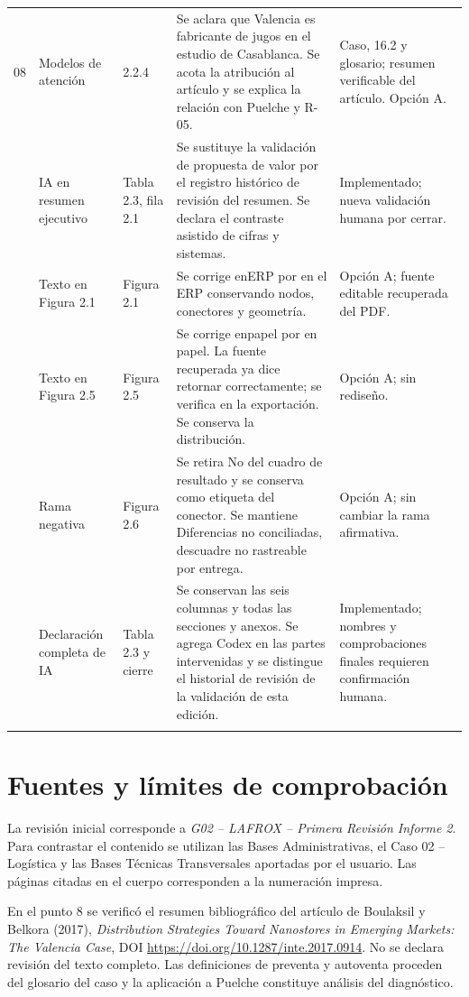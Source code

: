 \documentclass[11pt,letterpaper]{article}
\begin{document}
\begin{longtable}{P{0.55cm}P{2.25cm}P{2.1cm}P{6.1cm}P{4.05cm}}
08 & Modelos de atención & 2.2.4 & Se aclara que Valencia es fabricante de jugos en el estudio de Casablanca. Se acota la atribución al artículo y se explica la relación con Puelche y R-05. & Caso, 16.2 y glosario; resumen verificable del artículo. Opción A. \\  & IA en resumen ejecutivo & Tabla 2.3, fila 2.1 & Se sustituye la validación de propuesta de valor por el registro histórico de revisión del resumen. Se declara el contraste asistido de cifras y sistemas. & Implementado; nueva validación humana por cerrar. \\  & Texto en Figura 2.1 & Figura 2.1 & Se corrige enERP por en el ERP conservando nodos, conectores y geometría. & Opción A; fuente editable recuperada del PDF. \\  & Texto en Figura 2.5 & Figura 2.5 & Se corrige enpapel por en papel. La fuente recuperada ya dice retornar correctamente; se verifica en la exportación. Se conserva la distribución. & Opción A; sin rediseño. \\  & Rama negativa & Figura 2.6 & Se retira No del cuadro de resultado y se conserva como etiqueta del conector. Se mantiene Diferencias no conciliadas, descuadre no rastreable por entrega. & Opción A; sin cambiar la rama afirmativa. \\  & Declaración completa de IA & Tabla 2.3 y cierre & Se conservan las seis columnas y todas las secciones y anexos. Se agrega Codex en las partes intervenidas y se distingue el historial de revisión de la validación de esta edición. & Implementado; nombres y comprobaciones finales requieren confirmación humana. \\ \addlinespace
\end{longtable}
\normalsize
\section*{Fuentes y límites de comprobación}
La revisión inicial corresponde a \textit{G02 -- LAFROX -- Primera Revisión Informe 2}. Para contrastar el contenido se utilizan las Bases Administrativas, el Caso 02 -- Logística y las Bases Técnicas Transversales aportadas por el usuario. Las páginas citadas en el cuerpo corresponden a la numeración impresa.

En el punto 8 se verificó el resumen bibliográfico del artículo de Boulaksil y Belkora (2017), \textit{Distribution Strategies Toward Nanostores in Emerging Markets: The Valencia Case}, DOI \url{https://doi.org/10.1287/inte.2017.0914}. No se declara revisión del texto completo. Las definiciones de preventa y autoventa proceden del glosario del caso y la aplicación a Puelche constituye análisis del diagnóstico.
\end{document}
